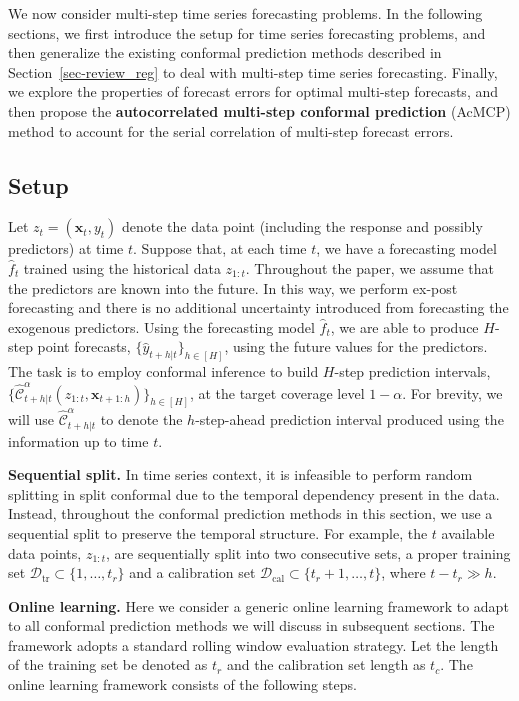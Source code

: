 \documentclass[
  11pt,
  a4paper,
]{article}
\theoremstyle{plain}
\theoremstyle{plain}
\theoremstyle{remark}
\begin{document}
We now consider multi-step time series forecasting problems. In the
following sections, we first introduce the setup for time series
forecasting problems, and then generalize the existing conformal
prediction methods described in Section~\ref{sec-review_reg} to deal
with multi-step time series forecasting. Finally, we explore the
properties of forecast errors for optimal multi-step forecasts, and then
propose the \textbf{autocorrelated multi-step conformal prediction}
(AcMCP) method to account for the serial correlation of multi-step
forecast errors.

\subsection{Setup}\label{sec-setup}

Let \(z_t = (\bm{x}_t, y_t)\) denote the data point (including the
response and possibly predictors) at time \(t\). Suppose that, at each
time \(t\), we have a forecasting model \(\hat{f}_t\) trained using the
historical data \(z_{1:t}\). Throughout the paper, we assume that the
predictors are known into the future. In this way, we perform ex-post
forecasting and there is no additional uncertainty introduced from
forecasting the exogenous predictors. Using the forecasting model
\(\hat{f}_t\), we are able to produce \(H\)-step point forecasts,
\(\{\hat{y}_{t+h|t}\}_{h\in[H]}\), using the future values for the
predictors. The task is to employ conformal inference to build
\(H\)-step prediction intervals,
\(\{\hat{\mathcal{C}}_{t+h|t}^{\alpha}\left(z_{1:t},\bm{x}_{t+1:h}\right)\}_{h\in[H]}\),
at the target coverage level \(1-\alpha\). For brevity, we will use
\(\hat{\mathcal{C}}_{t+h|t}^{\alpha}\) to denote the \(h\)-step-ahead
prediction interval produced using the information up to time \(t\).

\textbf{Sequential split.} In time series context, it is infeasible to
perform random splitting in split conformal due to the temporal
dependency present in the data. Instead, throughout the conformal
prediction methods in this section, we use a sequential split to
preserve the temporal structure. For example, the \(t\) available data
points, \(z_{1:t}\), are sequentially split into two consecutive sets, a
proper training set \(\mathcal{D}_{\text{tr}} \subset \{1,\ldots,t_r\}\)
and a calibration set
\(\mathcal{D}_{\text{cal}} \subset \{t_r+1,\ldots,t\}\), where
\(t-t_r \gg h\).

\textbf{Online learning.} Here we consider a generic online learning
framework to adapt to all conformal prediction methods we will discuss
in subsequent sections. The framework adopts a standard rolling window
evaluation strategy. Let the length of the training set be denoted as
\(t_r\)\hspace{0pt} and the calibration set length as
\(t_c\)\hspace{0pt}. The online learning framework consists of the
following steps.
\end{document}
